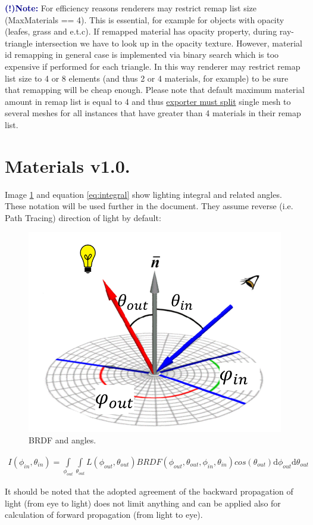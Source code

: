 \documentclass[12pt]{article}
\newcommand\boldblue[1]{\textcolor{darkblue}{\textbf{#1}}}
\begin{document}
\boldblue{(!)Note: } For efficiency reasons renderers may restrict remap list size (MaxMaterials == 4). This is essential, for example for objects with opacity (leafes, grass and e.t.c). If remapped material has opacity property, during ray-triangle intersection we have to look up in the opacity texture. However, material id remapping in general case is implemented via binary search which is too expensive if performed for each triangle. In this way renderer may restrict remap list size to 4 or 8 elements (and thus 2 or 4 materials, for example) to be sure that remapping will be cheap enough. Please note that default maximum material amount in remap list is equal to 4 and thus \underline{exporter must split} single mesh to several meshes for all instances that have greater than 4 materials in their remap list.      

\FloatBarrier

\section{Materials v1.0.}\label{materialgeneral}

Image \ref{fig:brdf} and equation \ref{eq:integral} show lighting integral and related angles. These notation will be used further in the document. They assume reverse (i.e. Path Tracing) direction of light by default: 

\begin{figure}[htb]
	\centering
	\includegraphics[width=0.3\linewidth]{images/brdf}           
	\caption{\label{fig:brdf}
		BRDF and angles.}   
\end{figure}

\begin{eqnarray}\label{eq:integral}
I(\phi_{in}, \theta_{in}) = \int\limits_{\phi_{out}}\int\limits_{\theta_{out}}  L(\phi_{out},\theta_{out})BRDF(\phi_{out},\theta_{out},\phi_{in},\theta_{in})cos(\theta_{out}) \mathrm{d}\phi_{out}  \mathrm{d}\theta_{out}
\end{eqnarray}

It should be noted that the adopted agreement of the backward propagation of light (from eye to light) does not limit anything and can be applied also for calculation of forward propagation (from light to eye).
\end{document}
